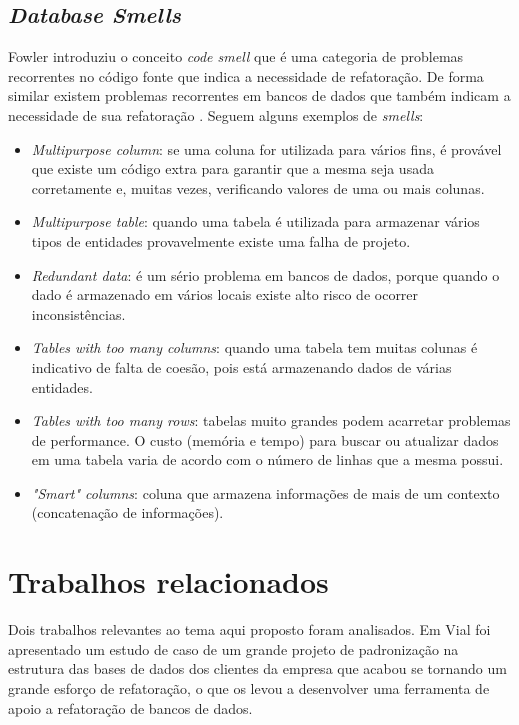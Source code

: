 \documentclass[10pt]{article}
\begin{document}
\subsection{\textit{Database Smells}}
	Fowler \cite{Fowler:Refatoracao} introduziu o conceito \textit{code smell} que é uma categoria de problemas recorrentes no código fonte que indica a necessidade de refatoração. De forma similar existem problemas recorrentes em bancos de dados que também indicam a necessidade de sua refatoração \cite{Ambler:RefactoringDatabases}. Seguem alguns exemplos de \textit{smells}:
	\begin{itemize}
		\item \textit{Multipurpose column}: se uma coluna for utilizada para vários fins, é provável que existe um código extra para garantir que a mesma seja usada corretamente e, muitas vezes, verificando valores de uma ou mais colunas.
		\item \textit{Multipurpose table}: quando uma tabela é utilizada para armazenar vários tipos de entidades provavelmente existe uma falha de projeto.
		\item \textit{Redundant data}: é um sério problema em bancos de dados, porque quando o dado é armazenado em vários locais existe alto risco de ocorrer inconsistências.
		\item \textit{Tables with too many columns}: quando uma tabela tem muitas colunas é indicativo de falta de coesão, pois está armazenando dados de várias entidades.
		\item \textit{Tables with too many rows}: tabelas muito grandes podem acarretar problemas de performance. O custo (memória e tempo) para buscar ou atualizar dados em uma tabela varia de acordo com o número de linhas que a mesma possui.
		\item \textit{"Smart" columns}: coluna que armazena informações de mais de um contexto (concatenação de informações).
	\end{itemize}


\section{Trabalhos relacionados}\label{sec:trabalhosrelacionados}

    Dois trabalhos relevantes ao tema aqui proposto foram analisados. Em Vial \cite{Vial:DatabaseRefactoringLessonsTrenches} foi apresentado um estudo de caso de um grande projeto de padronização na estrutura das bases de dados dos clientes da empresa que acabou se tornando um grande esforço de refatoração, o que os levou a desenvolver uma ferramenta de apoio a refatoração de bancos de dados.
    
\end{document}
